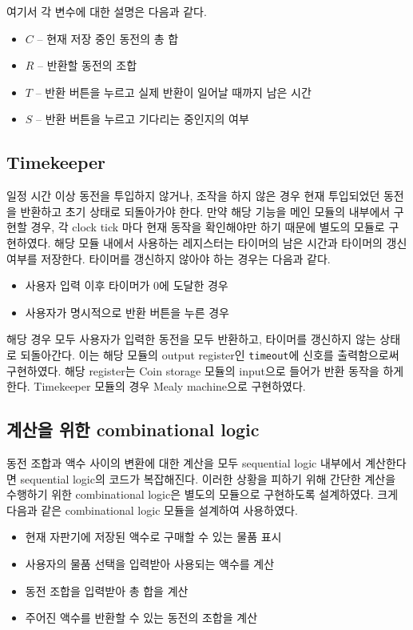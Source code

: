 \documentclass{scrartcl}
\begin{document}
여기서 각 변수에 대한 설명은 다음과 같다.

\begin{itemize}
  \item \(C\) -- 현재 저장 중인 동전의 총 합
  \item \(R\) -- 반환할 동전의 조합
  \item \(T\) -- 반환 버튼을 누르고 실제 반환이 일어날 때까지 남은 시간
  \item \(S\) -- 반환 버튼을 누르고 기다리는 중인지의 여부
\end{itemize}

\subsection{Timekeeper}
일정 시간 이상 동전을 투입하지 않거나, 조작을 하지 않은 경우 현재 투입되었던 동전을 반환하고 초기 상태로 되돌아가야 한다.
만약 해당 기능을 메인 모듈의 내부에서 구현할 경우, 각 clock tick 마다 현재 동작을 확인해야만 하기 때문에 별도의 모듈로
구현하였다.
해당 모듈 내에서 사용하는 레지스터는 타이머의 남은 시간과 타이머의 갱신 여부를 저장한다. 타이머를 갱신하지 않아야 하는 경우는
다음과 같다.

\begin{itemize}
  \item 사용자 입력 이후 타이머가 0에 도달한 경우
  \item 사용자가 명시적으로 반환 버튼을 누른 경우
\end{itemize}

해당 경우 모두 사용자가 입력한 동전을 모두 반환하고, 타이머를 갱신하지 않는 상태로 되돌아간다. 이는 해당 모듈의
output register인 \texttt{timeout}에 신호를 출력함으로써 구현하였다. 해당 register는 Coin storage 모듈의 input으로
들어가 반환 동작을 하게 한다.
Timekeeper 모듈의 경우 Mealy machine으로 구현하였다.

\subsection{계산을 위한 combinational logic}
동전 조합과 액수 사이의 변환에 대한 계산을 모두 sequential logic 내부에서 계산한다면 sequential logic의 코드가
복잡해진다. 이러한 상황을 피하기 위해 간단한 계산을 수행하기 위한 combinational logic은 별도의 모듈으로 구현하도록
설계하였다. 크게 다음과 같은 combinational logic 모듈을 설계하여 사용하였다.

\begin{itemize}
  \item 현재 자판기에 저장된 액수로 구매할 수 있는 물품 표시
  \item 사용자의 물품 선택을 입력받아 사용되는 액수를 계산
  \item 동전 조합을 입력받아 총 합을 계산
  \item 주어진 액수를 반환할 수 있는 동전의 조합을 계산
\end{itemize}
\end{document}
